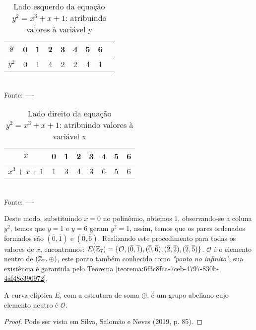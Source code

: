 \begin{table}[h!]\centering
	\caption{Lado esquerdo da equação $y^2 = x^3 + x + 1$: atribuindo valores à variável y}
	\begin{tabular}{|c|c|c|c|c|c|c|c|c|}
		\hline
		$y$   & 0 & 1 & 2 & 3 & 4  & 5  & 6  \\
		\hline
		$y^2$ & 0 & 1 & 4 & 2 & 2 & 4 & 1 \\
		\hline
	\end{tabular}
	\vspace*{0.4cm}\\ %
	Fonte:  ----
\end{table}

\begin{table}[h!]\centering
	\caption{Lado direito da equação $y^2 = x^3 + x + 1$: atribuindo valores à variável x}
	\begin{tabular}{|c|c|c|c|c|c|c|c|}
		\hline
		$x$           & 0 & 1 & 2 & 3 & 4 & 5 & 6 \\
		\hline
		$x^3 + x + 1$ & 1 & 3 & 4 & 3 & 6 & 5 & 6 \\
		\hline
	\end{tabular}
	\vspace*{0.4cm}\\ %
	Fonte:  ----
\end{table}

Deste modo, substituindo $x = 0$ no polinômio, obtemos $1$, observando-se a
coluna $y^2$, temos que $y = 1$ e $y = 6$ geram $y^2 =1$, assim, temos que os
pares ordenados formados são $(\overline{0}, \overline{1})$ e $(\overline{0},
	\overline{6})$. Realizando este procedimento para todas os valores de $x$,
encontramos: $E(\mathbb{Z}_{7}) = \{\mathcal{O}, (\overline{0}, \overline{1}),
	(\overline{0}, \overline{6}), (\overline{2}, \overline{2}), (\overline{2},
	\overline{5}) \}$. $\mathcal{O}$ é o elemento neutro de $(\mathbb{Z}_{7}, \oplus)$,
este ponto também conhecido como \textit{"ponto no infinito"}, sua existência é
garantida pelo Teorema \ref{teorema:6f3c8fca-7ceb-4797-830b-4af48c390972}.

\begin{teorema}\label{teorema:6f3c8fca-7ceb-4797-830b-4af48c390972}
	A curva elíptica $E$, com a estrutura de soma $\oplus$, é um grupo abeliano cujo elemento neutro é  $\mathcal{O}$.
\end{teorema}

\begin{proof}
	Pode ser vista em Silva, Salomão e Neves (2019, p. 85).
\end{proof}

